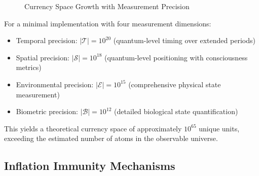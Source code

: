 \documentclass[12pt,a4paper]{article}
\begin{document}
\begin{figure}[H]
\centering
{}
\caption{Currency Space Growth with Measurement Precision}
\label{fig:currency_space}
\end{figure}

For a minimal implementation with four measurement dimensions:
\begin{itemize}
\item Temporal precision: $|\mathcal{T}| = 10^{20}$ (quantum-level timing over extended periods)
\item Spatial precision: $|\mathcal{S}| = 10^{18}$ (quantum-level positioning with consciousness metrics)  
\item Environmental precision: $|\mathcal{E}| = 10^{15}$ (comprehensive physical state measurement)
\item Biometric precision: $|\mathcal{B}| = 10^{12}$ (detailed biological state quantification)
\end{itemize}

This yields a theoretical currency space of approximately $10^{65}$ unique units, exceeding the estimated number of atoms in the observable universe.

\subsection{Inflation Immunity Mechanisms}
\end{document}
